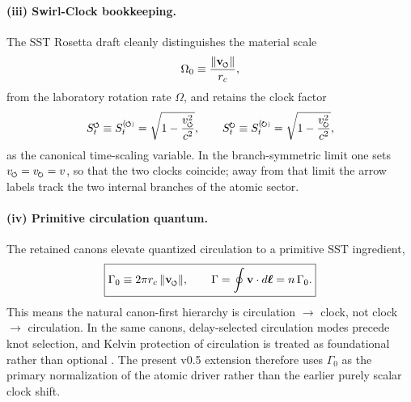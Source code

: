 \documentclass[11pt,a4paper]{article}
\newcommand{\swirlarrow}{\mathchoice{\mkern-2mu\scriptstyle\boldsymbol{\circlearrowleft}}{\mkern-2mu\scriptstyle\boldsymbol{\circlearrowleft}}{\mkern-2mu\scriptscriptstyle\boldsymbol{\circlearrowleft}}{\mkern-2mu\scriptscriptstyle\boldsymbol{\circlearrowleft}}}
\newcommand{\swirlarrowcw}{\mathchoice{\mkern-2mu\scriptstyle\boldsymbol{\circlearrowright}}{\mkern-2mu\scriptstyle\boldsymbol{\circlearrowright}}{\mkern-2mu\scriptscriptstyle\boldsymbol{\circlearrowright}}{\mkern-2mu\scriptscriptstyle\boldsymbol{\circlearrowright}}}
\newcommand{\vswirl}{\mathbf{v}_{\swirlarrow}}
\newcommand{\SwirlClock}{S_t^{\swirlarrow}}
\newcommand{\SwirlClockcw}{S_t^{\swirlarrowcw}}
\newcommand{\rc}{r_c}
\begin{document}
\paragraph{(iii) Swirl-Clock bookkeeping.} The SST Rosetta draft cleanly distinguishes the material scale
\begin{equation}
\label{eq:Omega0}
\Omega_0 \equiv \frac{\lVert \vswirl\rVert}{\rc},
\end{equation}
from the laboratory rotation rate $\Omega$, and retains the clock factor
\begin{equation}
\label{eq:SwirlClock}
\SwirlClock \equiv S_t^{(\swirlarrow)} = \sqrt{1-\frac{v_{\swirlarrow}^{2}}{c^2}},
\qquad
\SwirlClockcw \equiv S_t^{(\swirlarrowcw)} = \sqrt{1-\frac{v_{\swirlarrowcw}^{2}}{c^2}},
\end{equation}
as the canonical time-scaling variable. In the branch-symmetric limit one sets $v_{\swirlarrow}=v_{\swirlarrowcw}=v$, so that the two clocks coincide; away from that limit the arrow labels track the two internal branches of the atomic sector.

\paragraph{(iv) Primitive circulation quantum.} The retained canons elevate quantized circulation to a primitive SST ingredient,
\begin{equation}
\label{eq:Gamma0}
\boxed{
\Gamma_0 \equiv 2\pi \rc\,\lVert \vswirl\rVert,
\qquad
\Gamma = \oint \mathbf v\cdot d\boldsymbol\ell = n\,\Gamma_0.
}
\end{equation}
This means the natural canon-first hierarchy is circulation $\to$ clock, not clock $\to$ circulation. In the same canons, delay-selected circulation modes precede knot selection, and Kelvin protection of circulation is treated as foundational rather than optional \cite{IskandaraniCanon078,IskandaraniCanon060}. The present v0.5 extension therefore uses $\Gamma_0$ as the primary normalization of the atomic driver rather than the earlier purely scalar clock shift.
\end{document}
